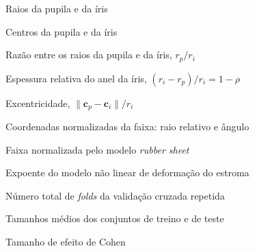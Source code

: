 \documentclass[12pt, oneside, a4paper, chapter=TITLE, section=TITLE,
               english, brazil]{abntex2}
\theoremstyle{plain}
\theoremstyle{definition}
\newcommand{\rs}{\emph{rubber sheet}}
\begin{document}
\begin{simbolos}
  \item[$r_p$, $r_i$] Raios da pupila e da íris
  \item[$\mathbf{c}_p$, $\mathbf{c}_i$] Centros da pupila e da íris
  \item[$\rho$] Razão entre os raios da pupila e da íris, $r_p/r_i$
  \item[$\tau$] Espessura relativa do anel da íris, $(r_i-r_p)/r_i=1-\rho$
  \item[$\epsilon$] Excentricidade, $\lVert\mathbf{c}_p-\mathbf{c}_i\rVert/r_i$
  \item[$(s,\theta)$] Coordenadas normalizadas da faixa: raio relativo e
    ângulo
  \item[$N(s,\theta)$] Faixa normalizada pelo modelo \rs
  \item[$\kappa$] Expoente do modelo não linear de deformação do estroma
  \item[$k$] Número total de \emph{folds} da validação cruzada repetida
  \item[$n_1$, $n_2$] Tamanhos médios dos conjuntos de treino e de teste
  \item[$d$] Tamanho de efeito de Cohen
\end{simbolos}

\tableofcontents*
\cleardoublepage

\textual
\pagestyle{abntsimples}



\postextual


\begin{apendicesenv}

\end{apendicesenv}
\end{document}
